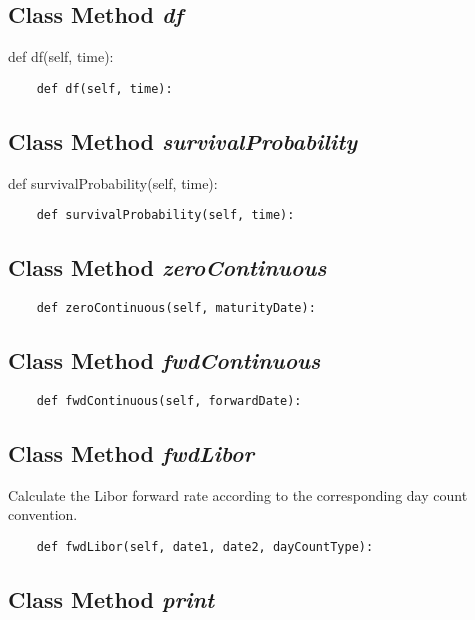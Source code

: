 \documentclass[twoside,11pt]{book}
\begin{document}
\subsection{Class Method {\it df}}
def df(self, time):

\begin{lstlisting}
    def df(self, time):
\end{lstlisting}

\subsection{Class Method {\it survivalProbability}}
def survivalProbability(self, time):

\begin{lstlisting}
    def survivalProbability(self, time):
\end{lstlisting}

\subsection{Class Method {\it zeroContinuous}}


\begin{lstlisting}
    def zeroContinuous(self, maturityDate):
\end{lstlisting}

\subsection{Class Method {\it fwdContinuous}}


\begin{lstlisting}
    def fwdContinuous(self, forwardDate):
\end{lstlisting}

\subsection{Class Method {\it fwdLibor}}
Calculate the Libor forward rate according to the corresponding day count convention. 

\begin{lstlisting}
    def fwdLibor(self, date1, date2, dayCountType):
\end{lstlisting}

\subsection{Class Method {\it print}}
\end{document}
